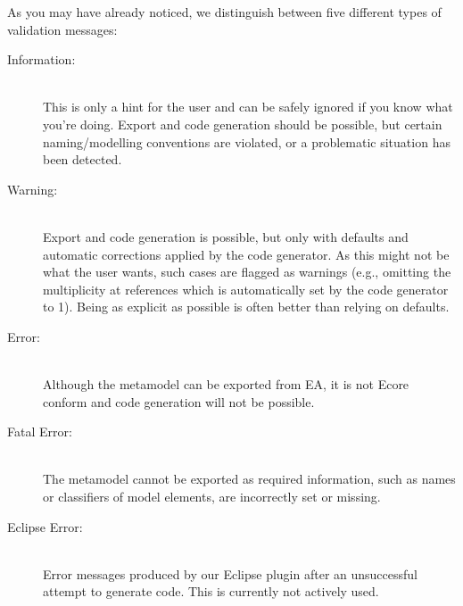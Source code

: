 As you may have already noticed, we distinguish between five different types of validation messages:
\begin{description}
  \item[Information:]~\\
  This is only a hint for the user and can be safely ignored if you know what you're doing.
  Export and code generation should be possible, but certain naming/modelling conventions are violated, or a problematic situation has been detected.
  
  \item[Warning:]~\\ Export and code generation is possible, but only with defaults and automatic corrections applied by the code generator.
  As this might not be what the user wants, such cases are flagged as warnings (e.g., omitting the multiplicity at references which is automatically set by the code generator to 1).
  Being as explicit as possible is often better than relying on defaults.
  
  \item[Error:]~\\ Although the metamodel can be exported from EA, it is not Ecore conform and code generation will not be possible.
 
  \item[Fatal Error:]~\\ The metamodel cannot be exported as required information, such as names or classifiers of model elements, are incorrectly set or missing.
  
  \item[Eclipse Error:]~\\ Error messages produced by our Eclipse plugin after an unsuccessful attempt to generate code.
  This is currently not actively used.

\end{description}

